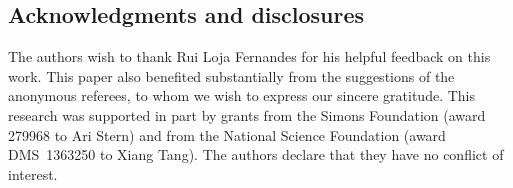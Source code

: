 \documentclass[10pt,a4paper]{amsart}
\numberwithin{equation}{section}
\begin{document}
\subsection*{Acknowledgments and disclosures}
The authors wish to thank Rui Loja Fernandes for his helpful feedback on this work. This paper also benef\/ited substantially from the suggestions of the anonymous referees, to whom we wish to express our sincere gratitude.
This research was supported in part by grants from the Simons Foundation (award 279968 to Ari Stern) and from the National Science Foundation (award DMS~1363250 to Xiang Tang).
The authors declare that they have no conf\/lict of interest.

\end{document}
